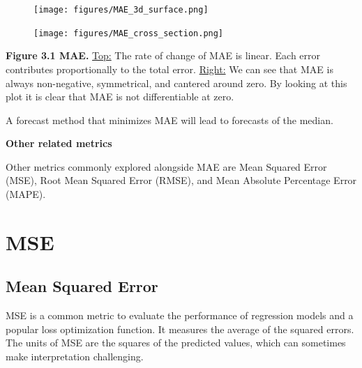 \clearpage

\thispagestyle{customstyle}

\begin{figure}[ht!]
    \centering
    \texttt{[image: figures/MAE\_3d\_surface.png]}
\end{figure}

\begin{figure}
    \centering
    \vspace{-10pt} %
    \texttt{[image: figures/MAE\_cross\_section.png]} %
    \vspace{-10pt} %
\end{figure}

\textbf{Figure 3.1 MAE.} \underline{Top:} The rate of change of MAE is linear. 
Each error contributes proportionally to the total error. 
\underline{Right:} We can see that MAE is always non-negative, symmetrical,
and cantered around zero. By looking at this plot it is clear that MAE is not differentiable at zero.

{A forecast method that minimizes MAE
will lead to forecasts of the median.}


\textbf{Other related metrics}

Other metrics commonly explored alongside MAE are Mean Squared Error (MSE), Root Mean Squared Error (RMSE), 
and Mean Absolute Percentage Error (MAPE).

\clearpage
\thispagestyle{regressionstyle}
\section{MSE}
\subsection{Mean Squared Error}

MSE is a common metric to evaluate the performance of regression models and a popular loss optimization function. It measures the average of the squared errors.
The units of MSE are the squares of the predicted values, which can sometimes make interpretation challenging.

\begin{center}
\end{center}

